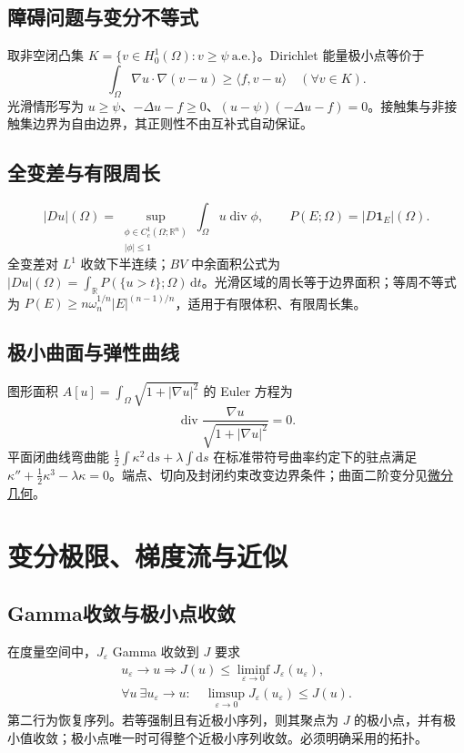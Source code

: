 \documentclass[../main.tex]{subfiles}
\begin{document}
\subsection{障碍问题与变分不等式}
取非空闭凸集 $K=\{v\in H_0^1(\Omega):v\ge\psi\ \text{a.e.}\}$。Dirichlet 能量极小点等价于
\[
\int_\Omega\nabla u\cdot\nabla(v-u)\ge\langle f,v-u\rangle\quad(\forall v\in K).
\]
光滑情形写为 $u\ge\psi$、$-\Delta u-f\ge0$、$(u-\psi)(-\Delta u-f)=0$。接触集与非接触集边界为自由边界，其正则性不由互补式自动保证。
\subsection{全变差与有限周长}
\[
|Du|(\Omega)=\sup_{\substack{\phi\in C_c^1(\Omega;\mathbb R^n)\\|\phi|\le1}}
\int_\Omega u\operatorname{div}\phi,\qquad
P(E;\Omega)=|D\bm1_E|(\Omega).
\]
全变差对 $L^1$ 收敛下半连续；$BV$ 中余面积公式为 $|Du|(\Omega)=\int_{\mathbb R}P(\{u>t\};\Omega)\,\mathrm dt$。光滑区域的周长等于边界面积；等周不等式为 $P(E)\ge n\omega_n^{1/n}|E|^{(n-1)/n}$，适用于有限体积、有限周长集。
\subsection{极小曲面与弹性曲线}
图形面积 $A[u]=\int_\Omega\sqrt{1+|\nabla u|^2}$ 的 Euler 方程为
\[
\operatorname{div}\frac{\nabla u}{\sqrt{1+|\nabla u|^2}}=0.
\]
平面闭曲线弯曲能 $\frac12\int\kappa^2\,\mathrm ds+\lambda\int\mathrm ds$ 在标准带符号曲率约定下的驻点满足 $\kappa''+\frac12\kappa^3-\lambda\kappa=0$。端点、切向及封闭约束改变边界条件；曲面二阶变分见\hyperref[chap:differential-geometry]{微分几何}。
\section{变分极限、梯度流与近似}
\subsection{Gamma收敛与极小点收敛}
在度量空间中，$J_\varepsilon$ Gamma 收敛到 $J$ 要求
\begin{gather*}
u_\varepsilon\to u\Rightarrow J(u)\le\liminf_{\varepsilon\to0}J_\varepsilon(u_\varepsilon),\\
\forall u\ \exists u_\varepsilon\to u:\quad
\limsup_{\varepsilon\to0}J_\varepsilon(u_\varepsilon)\le J(u).
\end{gather*}
第二行为恢复序列。若等强制且有近极小序列，则其聚点为 $J$ 的极小点，并有极小值收敛；极小点唯一时可得整个近极小序列收敛。必须明确采用的拓扑。
\end{document}
